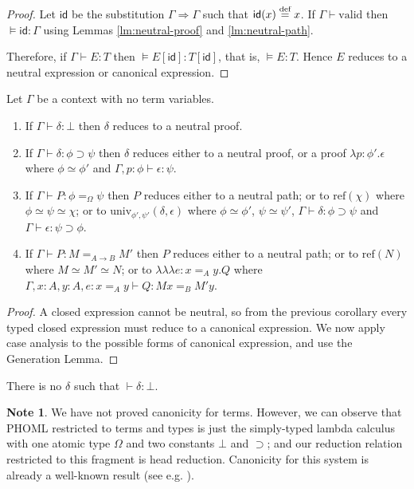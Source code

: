\documentclass[a4paper,UKenglish]{lipics-v2016}
\newcommand*{\eqdef}{\mathrel{\smash{\stackrel{\text{def}}{=}}}}
\newcommand*{\reff}[1]{\ensuremath{\mathrm{ref} \left( {#1} \right)}}
\newcommand*{\univ}[4]{\ensuremath{\mathrm{univ}_{{#1}, {#2}} \left({#3} , {#4} \right)}}
\newcommand*{\triplelambda}{\ensuremath{\lambda \!\! \lambda \!\! \lambda}}
\newcommand*{\vald}{\ensuremath{\vdash \mathrm{valid}}}
\newcommand{\id}{\mathsf{id}}
\theoremstyle{plain}
\theoremstyle{definition}
\newtheorem{note}[theorem]{Note}
\begin{document}
\begin{proof}
Let $\id$ be the substitution $\Gamma \Rightarrow \Gamma$ such that $\id(x) \eqdef x$.
If $\Gamma \vald$ then $\models \id : \Gamma$ using Lemmas \ref{lm:neutral-proof} and \ref{lm:neutral-path}.

Therefore, if $\Gamma \vdash E : T$ then $\models E [ \id ] : T [ \id ]$, that is, $\models E : T$.  Hence $E$ reduces to
a neutral expression or canonical expression.
\end{proof}

\begin{corollary}[Canonicity]
Let $\Gamma$ be a context with no term variables.
\begin{enumerate}
\item
If $\Gamma \vdash \delta : \bot$ then $\delta$ reduces to a neutral proof.
\item
If $\Gamma \vdash \delta : \phi \supset \psi$ then $\delta$ reduces either to a neutral proof, or a proof $\lambda p : \phi' . \epsilon$ where $\phi \simeq \phi'$
and $\Gamma, p : \phi \vdash \epsilon : \psi$.
\item
If $\Gamma \vdash P : \phi =_\Omega \psi$ then $P$ reduces either to a neutral path; or to $\reff{\chi}$ where $\phi \simeq \psi \simeq \chi$; or to
$\univ{\phi'}{\psi'}{\delta}{\epsilon}$ where $\phi \simeq \phi'$, $\psi \simeq \psi'$, $\Gamma \vdash \delta : \phi \supset \psi$ and $\Gamma \vdash \epsilon : \psi \supset \phi$.
\item
If $\Gamma \vdash P : M =_{A \rightarrow B} M'$ then $P$ reduces either to a neutral path; or to $\reff{N}$ where $M \simeq M' \simeq N$; or to
$\triplelambda e : x =_A y. Q$ where $\Gamma, x : A, y : A, e : x =_A y \vdash Q : Mx =_B M'y$.
\end{enumerate}
\end{corollary}

\begin{proof}
A closed expression cannot be neutral, so from the previous corollary every typed closed expression must reduce to a canonical expression.
We now apply case analysis to the possible forms of canonical expression, and use the Generation Lemma.
\end{proof}

\begin{corollary}[Conistency]
There is no $\delta$ such that $\vdash \delta : \bot$.
\end{corollary}

\begin{note}
We have not proved canonicity for terms.  However, we can observe that PHOML restricted to terms and types is just the simply-typed lambda calculus
with one atomic type $\Omega$ and two constants $\bot$ and $\supset$; and our reduction relation restricted to this fragment is head reduction.
Canonicity for this system is already a well-known result (see e.g. \cite[Ch. 4]{Girard1989}).
\end{note}
\end{document}
